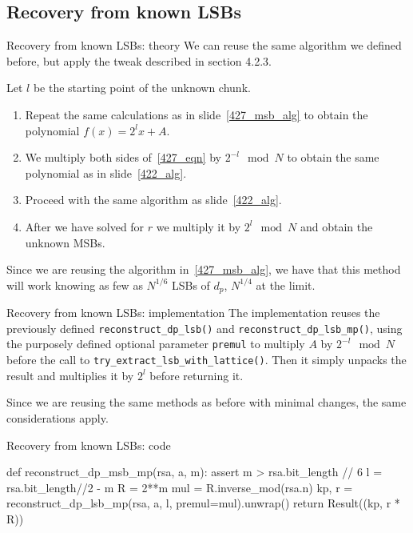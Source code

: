 \documentclass[usepdftitle=false]{beamer}
\begin{document}
\subsection{Recovery from known LSBs}
\begin{frame}{Recovery from known LSBs: theory}\label{427_lsb_alg}
We can reuse the same algorithm we defined before, but apply the tweak described in section 4.2.3.
\vspace{10pt}

Let $l$ be the starting point of the unknown chunk.
\begin{enumerate}
    \item Repeat the same calculations as in slide~\ref{427_msb_alg} to obtain the polynomial
          $f(x) = 2^l x + A$.
    \item We multiply both sides of~\ref{427_eqn} by $2^{-l} \mod N$ to obtain the same polynomial
          as in slide~\ref{422_alg}.
    \item Proceed with the same algorithm as slide~\ref{422_alg}.
    \item After we have solved for $r$ we multiply it by $2^l \mod N$ and obtain the unknown MSBs.
\end{enumerate}

Since we are reusing the algorithm in~\ref{427_msb_alg}, we have that this method will work knowing as
few as $N^{1/6}$ LSBs of $d_p$, $N^{1/4}$ at the limit.
\end{frame}
\begin{frame}{Recovery from known LSBs: implementation}
The implementation reuses the previously defined \texttt{reconstruct\_dp\_lsb()} and 
\texttt{reconstruct\_dp\_lsb\_mp()}, using the purposely defined optional parameter \texttt{premul}
to multiply $A$ by $2^{-l} \mod N$ before the call to \texttt{try\_extract\_lsb\_with\_lattice()}.
Then it simply unpacks the result and multiplies it by $2^l$ before returning it.

\vspace{10pt}

Since we are reusing the same methods as before with minimal changes, the same considerations apply.
\end{frame}
\begin{frame}[fragile=singleslide]{Recovery from known LSBs: code}
\begin{python}
def reconstruct_dp_msb_mp(rsa, a, m):
  assert m > rsa.bit_length // 6
  l = rsa.bit_length//2 - m
  R = 2**m
  mul = R.inverse_mod(rsa.n)
  kp, r = reconstruct_dp_lsb_mp(rsa, a, l,
                                premul=mul).unwrap()
  return Result((kp, r * R))
\end{python}
\end{frame}
\end{document}
